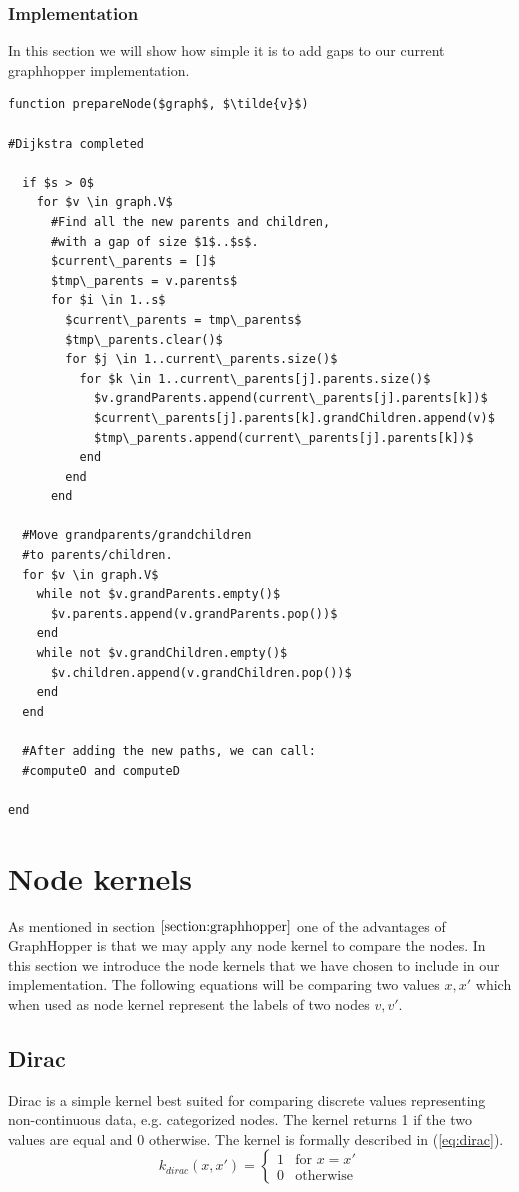 \documentclass{article}
\begin{document}
\subsubsection{Implementation}
In this section we will show how simple it is to add gaps to our current graphhopper implementation.
\begin{lstlisting}
function prepareNode($graph$, $\tilde{v}$)

#Dijkstra completed

  if $s > 0$
    for $v \in graph.V$
      #Find all the new parents and children, 
      #with a gap of size $1$..$s$.
      $current\_parents = []$
      $tmp\_parents = v.parents$
      for $i \in 1..s$
        $current\_parents = tmp\_parents$
        $tmp\_parents.clear()$
        for $j \in 1..current\_parents.size()$
          for $k \in 1..current\_parents[j].parents.size()$
            $v.grandParents.append(current\_parents[j].parents[k])$
            $current\_parents[j].parents[k].grandChildren.append(v)$
            $tmp\_parents.append(current\_parents[j].parents[k])$
          end
        end
      end

  #Move grandparents/grandchildren
  #to parents/children.
  for $v \in graph.V$
    while not $v.grandParents.empty()$
      $v.parents.append(v.grandParents.pop())$
    end
    while not $v.grandChildren.empty()$
      $v.children.append(v.grandChildren.pop())$
    end
  end

  #After adding the new paths, we can call:
  #computeO and computeD

end
\end{lstlisting}

\section{Node kernels}
\label{section:node-kernels}
As mentioned in section $\ref{section:graphhopper}$ one of the advantages of GraphHopper is that we may apply any node kernel to compare the nodes. In this section we introduce the node kernels that we have chosen to include in our implementation. The following equations will be comparing two values $x,x'$ which when used as node kernel represent the labels of two nodes $v,v'$.

\subsection{Dirac}
Dirac is a simple kernel best suited for comparing discrete values representing non-continuous data, e.g. categorized nodes. The kernel returns 1 if the two values are equal and 0 otherwise. The kernel is formally described in (\ref{eq:dirac}).
\begin{equation}
\label{eq:dirac}
k_{dirac}(x, x')=\begin{cases}
1 & \text{for }x=x'\\
0 & \text{otherwise}
\end{cases}
\end{equation}
\end{document}
